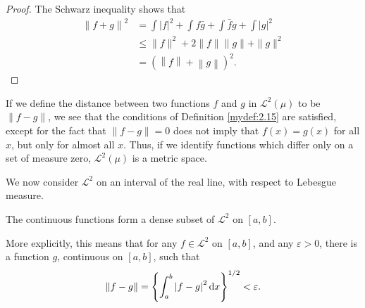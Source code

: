 \begin{proof}
    The Schwarz inequality shows that
    \begin{align*}
        \left\| f + g \right\|^2
         & = \int |f|^2 + \int f\bar{g} + \int \bar{f}g + \int |g|^2    \\
         & \leq \|f\|^2 + 2\|f\| \|g\| + \|g\|^2                        \\
         & = \left( \left\| f \right\| + \left\| g \right\| \right)^2 .
    \end{align*}
\end{proof}

\begin{myremark}
    \label{myremark:11.37}
    If we define  the distance between two functions $f$ and $g$ in
    $\mathscr{L}^2(\mu)$ to be $\left\| f-g \right\|$,
    we see that the conditions of Definition \ref{mydef:2.15} are satisfied,
    except for the fact that $\left\| f-g \right\| = 0$ does not imply that $f(x) = g(x)$ for all $x$,
    but only for almost all $x$.
    Thus, if we identify functions which differ only on a
    set of measure zero, $\mathscr{L}^2(\mu)$ is a metric space.

    We now consider $\mathscr{L}^2$ on an interval of the real line, with respect to
    Lebesgue measure.
\end{myremark}

\begin{thm}
    \label{thm:11.38}
    The continuous functions form a dense subset of $\mathscr{L}^2$ on $[a, b]$.
\end{thm}

More explicitly, this means that for any $f \in \mathscr{L}^2$ on $[a, b]$, and any $\varepsilon > 0$,
there is a function $g$, continuous on $[a, b]$, such that
\begin{equation*}
    \left\| f - g \right\| =
    \left\{ \int_{a}^{b} \left| f - g \right|^2 \d x \right\}^{1/2} <
    \varepsilon.
\end{equation*}


